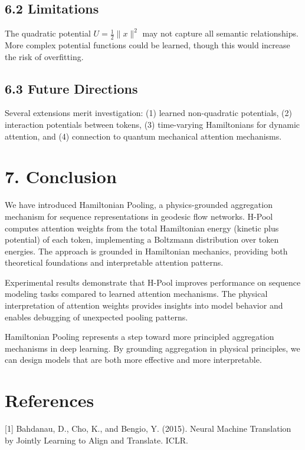 \documentclass[12pt]{article}
\begin{document}
\subsection{6.2 Limitations}

The quadratic potential $U = \frac{1}{2}\|x\|^2$ may not capture all semantic relationships. More complex potential functions could be learned, though this would increase the risk of overfitting.

\subsection{6.3 Future Directions}

Several extensions merit investigation: (1) learned non-quadratic potentials, (2) interaction potentials between tokens, (3) time-varying Hamiltonians for dynamic attention, and (4) connection to quantum mechanical attention mechanisms.

\section{7. Conclusion}

We have introduced Hamiltonian Pooling, a physics-grounded aggregation mechanism for sequence representations in geodesic flow networks. H-Pool computes attention weights from the total Hamiltonian energy (kinetic plus potential) of each token, implementing a Boltzmann distribution over token energies. The approach is grounded in Hamiltonian mechanics, providing both theoretical foundations and interpretable attention patterns.

Experimental results demonstrate that H-Pool improves performance on sequence modeling tasks compared to learned attention mechanisms. The physical interpretation of attention weights provides insights into model behavior and enables debugging of unexpected pooling patterns.

Hamiltonian Pooling represents a step toward more principled aggregation mechanisms in deep learning. By grounding aggregation in physical principles, we can design models that are both more effective and more interpretable.

\section*{References}

[1] Bahdanau, D., Cho, K., and Bengio, Y. (2015). Neural Machine Translation by Jointly Learning to Align and Translate. ICLR.
\end{document}
